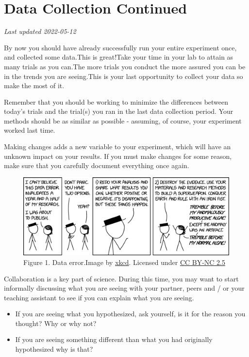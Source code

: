 \documentclass[
]{book}
\providecommand{\tightlist}{%
  \setlength{\itemsep}{0pt}\setlength{\parskip}{0pt}}
\begin{document}
\hypertarget{data-collection-continued}{%
\chapter*{Data Collection Continued}\label{data-collection-continued}}

\emph{Last updated 2022-05-12}

By now you should have already successfully run your entire experiment once, and collected some data.This is great!Take your time in your lab to attain as many trials as you can.The more trials you conduct the more assured you can be in the trends you are seeing.This is your last opportunity to collect your data so make the most of it.

Remember that you should be working to minimize the differences between today's trials and the trial(s) you ran in the last data collection period. Your methods should be as similar as possible - assuming, of course, your experiment worked last time.

Making changes adds a new variable to your experiment, which will have an unknown impact on your results. If you must make changes for some reason, make sure that you carefully document everything once again.

\begin{figure}
\centering
\includegraphics{figures_images/Lab8-Fig1.png}
\caption{Figure 1. Data error.Image by \href{https://xkcd.com/2239/}{xkcd}. Licensed under \href{https://creativecommons.org/licenses/by-nc/2.5/}{CC BY-NC 2.5}}
\end{figure}

Collaboration is a key part of science. During this time, you may want to start informally discussing what you are seeing with your partner, peers and / or your teaching assistant to see if you can explain what you are seeing.

\begin{itemize}
\tightlist
\item
  If you are seeing what you hypothesized, ask yourself, is it for the reason you thought? Why or why not?
\item
  If you are seeing something different than what you had originally hypothesized why is that?
\end{itemize}
\end{document}
